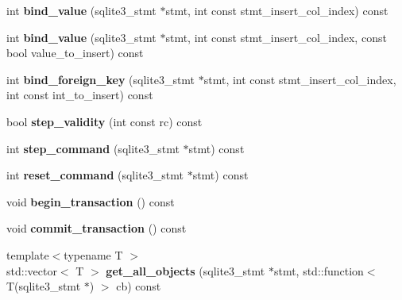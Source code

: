 \begin{DoxyCompactItemize}
int {\bfseries bind\+\_\+value} (sqlite3\+\_\+stmt $\ast$stmt, int const stmt\+\_\+insert\+\_\+col\+\_\+index) const
\item 
\mbox{\label{class_s_q_lite_wrapper_a4b6f58f924fae97702115f34ea8abf22}} 
int {\bfseries bind\+\_\+value} (sqlite3\+\_\+stmt $\ast$stmt, int const stmt\+\_\+insert\+\_\+col\+\_\+index, const bool value\+\_\+to\+\_\+insert) const
\item 
\mbox{\label{class_s_q_lite_wrapper_a21b4c5733febabb2a4f21772b7cfdec1}} 
int {\bfseries bind\+\_\+foreign\+\_\+key} (sqlite3\+\_\+stmt $\ast$stmt, int const stmt\+\_\+insert\+\_\+col\+\_\+index, int const int\+\_\+to\+\_\+insert) const
\item 
\mbox{\label{class_s_q_lite_wrapper_a2c0169834d2518ede1f00b92ffbed3e2}} 
bool {\bfseries step\+\_\+validity} (int const rc) const
\item 
\mbox{\label{class_s_q_lite_wrapper_aed2fd5a33db820461662e6ffdc05808b}} 
int {\bfseries step\+\_\+command} (sqlite3\+\_\+stmt $\ast$stmt) const
\item 
\mbox{\label{class_s_q_lite_wrapper_aeef995f134463b92babcd805444a1783}} 
int {\bfseries reset\+\_\+command} (sqlite3\+\_\+stmt $\ast$stmt) const
\item 
\mbox{\label{class_s_q_lite_wrapper_a7390f800549dbb01bb6bea58f3834c0c}} 
void {\bfseries begin\+\_\+transaction} () const
\item 
\mbox{\label{class_s_q_lite_wrapper_a80905f75cc7115658a61037a4c7a2e62}} 
void {\bfseries commit\+\_\+transaction} () const
\item 
\mbox{\label{class_s_q_lite_wrapper_ad729120a855cf8db16940f9798897cc5}} 
{\footnotesize template$<$typename T $>$ }\\std\+::vector$<$ T $>$ {\bfseries get\+\_\+all\+\_\+objects} (sqlite3\+\_\+stmt $\ast$stmt, std\+::function$<$ T(sqlite3\+\_\+stmt $\ast$) $>$ cb) const
\item 
\mbox{\label{class_s_q_lite_wrapper_a7b08d5d170b1c19f7a0be0ecdec4195e}} 

\end{DoxyCompactItemize}
